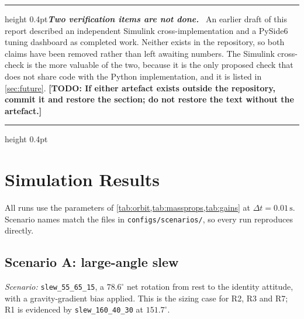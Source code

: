 \documentclass[conference,10pt,a4paper]{IEEEtran}
\newcommand{\remarkrule}{\par\nobreak\vspace{2pt}%
  \hrule height 0.4pt\vspace{4pt}\nobreak}
\newenvironment{cautionbox}[1][Caveat]
  {\par\medskip\remarkrule\noindent\small\textbf{\textit{#1.}}\ \ignorespaces}
  {\par\vspace{3pt}\hrule height 0.4pt\par\medskip\ignorespacesafterend}
\newcommand{\TODO}[1]{\textbf{[TODO: #1]}}
\newcommand{\TODO}[1]{}
\newcommand{\unit}[1]{\ensuremath{\,\mathrm{#1}}}
\begin{document}
\begin{cautionbox}[Two verification items are not done]
An earlier draft of this report described an independent Simulink
cross-implementation and a PySide6 tuning dashboard as completed work. Neither
exists in the repository, so both claims have been removed rather than left
awaiting numbers. The Simulink cross-check is the more valuable of the two,
because it is the only proposed check that does not share code with the Python
implementation, and it is listed in \cref{sec:future}. \TODO{If either artefact
exists outside the repository, commit it and restore the section; do not
restore the text without the artefact.}
\end{cautionbox}

\section{Simulation Results}
\label{sec:results}

All runs use the parameters of \cref{tab:orbit,tab:massprops,tab:gains} at
$\Delta t=0.01\unit{s}$. Scenario names match the files in
\texttt{configs/scenarios/}, so every run reproduces directly.

\subsection{Scenario A: large-angle slew}
\label{sec:scenarioA}

\textit{Scenario:} \texttt{slew\_55\_65\_15}, a $78.6^\circ$ net rotation from
rest to the identity attitude, with a gravity-gradient bias applied. This is
the sizing case for R2, R3 and R7; R1 is evidenced by
\texttt{slew\_160\_40\_30} at $151.7^\circ$.
\end{document}
